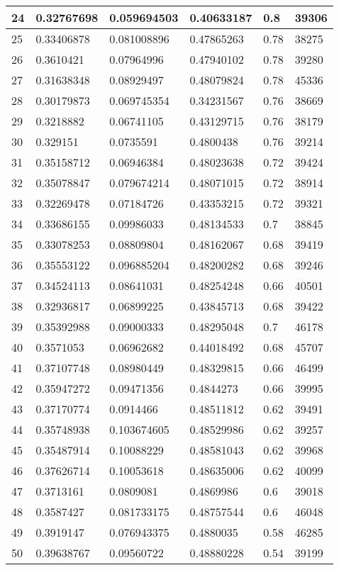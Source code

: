 \begin{longtable}{|l|l|l|l|l|l|}
24 & 0.32767698 & 0.059694503 & 0.40633187 & 0.8 & 39306 \\ \hline 
25 & 0.33406878 & 0.081008896 & 0.47865263 & 0.78 & 38275 \\ \hline 
26 & 0.3610421 & 0.07964996 & 0.47940102 & 0.78 & 39280 \\ \hline 
27 & 0.31638348 & 0.08929497 & 0.48079824 & 0.78 & 45336 \\ \hline 
28 & 0.30179873 & 0.069745354 & 0.34231567 & 0.76 & 38669 \\ \hline 
29 & 0.3218882 & 0.06741105 & 0.43129715 & 0.76 & 38179 \\ \hline 
30 & 0.329151 & 0.0735591 & 0.4800438 & 0.76 & 39214 \\ \hline 
31 & 0.35158712 & 0.06946384 & 0.48023638 & 0.72 & 39424 \\ \hline 
32 & 0.35078847 & 0.079674214 & 0.48071015 & 0.72 & 38914 \\ \hline 
33 & 0.32269478 & 0.07184726 & 0.43353215 & 0.72 & 39321 \\ \hline 
34 & 0.33686155 & 0.09986033 & 0.48134533 & 0.7 & 38845 \\ \hline 
35 & 0.33078253 & 0.08809804 & 0.48162067 & 0.68 & 39419 \\ \hline 
36 & 0.35553122 & 0.096885204 & 0.48200282 & 0.68 & 39246 \\ \hline 
37 & 0.34524113 & 0.08641031 & 0.48254248 & 0.66 & 40501 \\ \hline 
38 & 0.32936817 & 0.06899225 & 0.43845713 & 0.68 & 39422 \\ \hline 
39 & 0.35392988 & 0.09000333 & 0.48295048 & 0.7 & 46178 \\ \hline 
40 & 0.3571053 & 0.06962682 & 0.44018492 & 0.68 & 45707 \\ \hline 
41 & 0.37107748 & 0.08980449 & 0.48329815 & 0.66 & 46499 \\ \hline 
42 & 0.35947272 & 0.09471356 & 0.4844273 & 0.66 & 39995 \\ \hline 
43 & 0.37170774 & 0.0914466 & 0.48511812 & 0.62 & 39491 \\ \hline 
44 & 0.35748938 & 0.103674605 & 0.48529986 & 0.62 & 39257 \\ \hline 
45 & 0.35487914 & 0.10088229 & 0.48581043 & 0.62 & 39968 \\ \hline 
46 & 0.37626714 & 0.10053618 & 0.48635006 & 0.62 & 40099 \\ \hline 
47 & 0.3713161 & 0.0809081 & 0.4869986 & 0.6 & 39018 \\ \hline 
48 & 0.3587427 & 0.081733175 & 0.48757544 & 0.6 & 46048 \\ \hline 
49 & 0.3919147 & 0.076943375 & 0.4880035 & 0.58 & 46285 \\ \hline 
50 & 0.39638767 & 0.09560722 & 0.48880228 & 0.54 & 39199 \\ \hline 
\end{longtable}